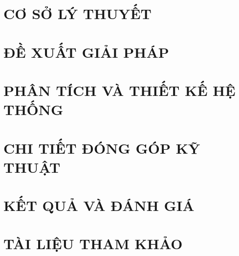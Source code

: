 \documentclass[a4paper,13pt,3p,twoside]{report}
\theoremstyle{definition}
\begin{document}
\newpage
\chapter{CƠ SỞ LÝ THUYẾT}


\newpage
\chapter{ĐỀ XUẤT GIẢI PHÁP}


\newpage
\chapter{PHÂN TÍCH VÀ THIẾT KẾ HỆ THỐNG}


\newpage
\chapter{CHI TIẾT ĐÓNG GÓP KỸ THUẬT}


\newpage
\chapter{KẾT QUẢ VÀ ĐÁNH GIÁ}


\newpage
\begingroup
\let\cleardoublepage\clearpage
\chapter*{TÀI LIỆU THAM KHẢO}

\endgroup
\end{document}
